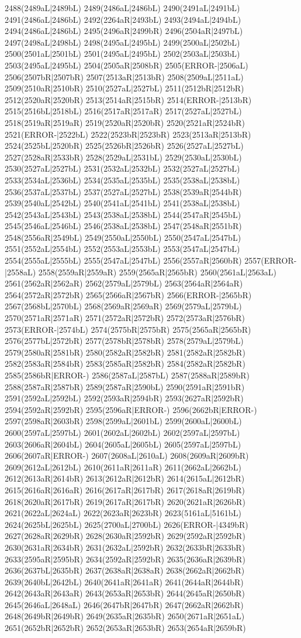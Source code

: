 2488(2489aL|2489bL) 2489(2486aL|2486bL) 2490(2491aL|2491bL) 2491(2486aL|2486bL) 2492(2264aR|2493bL) 2493(2494aL|2494bL) 2494(2486aL|2486bL) 2495(2496aR|2499bR) 2496(2504aR|2497bL) 2497(2498aL|2498bL) 2498(2495aL|2495bL) 2499(2500aL|2502bL) 2500(2501aL|2501bL) 2501(2495aL|2495bL) 2502(2503aL|2503bL) 2503(2495aL|2495bL) 2504(2505aR|2508bR) 2505(ERROR-|2506aL) 2506(2507bR|2507bR) 2507(2513aR|2513bR) 2508(2509aL|2511aL) 2509(2510aR|2510bR) 2510(2527aL|2527bL) 2511(2512bR|2512bR) 2512(2520aR|2520bR) 2513(2514aR|2515bR) 2514(ERROR-|2513bR) 2515(2516bL|2518bL) 2516(2517aR|2517aR) 2517(2527aL|2527bL) 2518(2519aR|2519aR) 2519(2520aR|2520bR) 2520(2521aR|2524bR) 2521(ERROR-|2522bL) 2522(2523bR|2523bR) 2523(2513aR|2513bR) 2524(2525bL|2520bR) 2525(2526bR|2526bR) 2526(2527aL|2527bL) 2527(2528aR|2533bR) 2528(2529aL|2531bL) 2529(2530aL|2530bL) 2530(2527aL|2527bL) 2531(2532aL|2532bL) 2532(2527aL|2527bL) 2533(2534aL|2536bL) 2534(2535aL|2535bL) 2535(2538aL|2538bL) 2536(2537aL|2537bL) 2537(2527aL|2527bL) 2538(2539aR|2544bR) 2539(2540aL|2542bL) 2540(2541aL|2541bL) 2541(2538aL|2538bL) 2542(2543aL|2543bL) 2543(2538aL|2538bL) 2544(2547aR|2545bL) 2545(2546aL|2546bL) 2546(2538aL|2538bL) 2547(2548aR|2551bR) 2548(2556aR|2549bL) 2549(2550aL|2550bL) 2550(2547aL|2547bL) 2551(2552aL|2554bL) 2552(2553aL|2553bL) 2553(2547aL|2547bL) 2554(2555aL|2555bL) 2555(2547aL|2547bL) 2556(2557aR|2560bR) 2557(ERROR-|2558aL) 2558(2559aR|2559aR) 2559(2565aR|2565bR) 2560(2561aL|2563aL) 2561(2562aR|2562aR) 2562(2579aL|2579bL) 2563(2564aR|2564aR) 2564(2572aR|2572bR) 2565(2566aR|2567bR) 2566(ERROR-|2565bR) 2567(2568bL|2570bL) 2568(2569aR|2569aR) 2569(2579aL|2579bL) 2570(2571aR|2571aR) 2571(2572aR|2572bR) 2572(2573aR|2576bR) 2573(ERROR-|2574bL) 2574(2575bR|2575bR) 2575(2565aR|2565bR) 2576(2577bL|2572bR) 2577(2578bR|2578bR) 2578(2579aL|2579bL) 2579(2580aR|2581bR) 2580(2582aR|2582bR) 2581(2582aR|2582bR) 2582(2583aR|2584bR) 2583(2585aR|2582bR) 2584(2582aR|2582bR) 2585(2586bR|ERROR-) 2586(2587aL|2587bL) 2587(2588aR|2589bR) 2588(2587aR|2587bR) 2589(2587aR|2590bL) 2590(2591aR|2591bR) 2591(2592aL|2592bL) 2592(2593aR|2594bR) 2593(2627aR|2592bR) 2594(2592aR|2592bR) 2595(2596aR|ERROR-) 2596(2662bR|ERROR-) 2597(2598aR|2603bR) 2598(2599aL|2601bL) 2599(2600aL|2600bL) 2600(2597aL|2597bL) 2601(2602aL|2602bL) 2602(2597aL|2597bL) 2603(2606aR|2604bL) 2604(2605aL|2605bL) 2605(2597aL|2597bL) 2606(2607aR|ERROR-) 2607(2608aL|2610aL) 2608(2609aR|2609bR) 2609(2612aL|2612bL) 2610(2611aR|2611aR) 2611(2662aL|2662bL) 2612(2613aR|2614bR) 2613(2612aR|2612bR) 2614(2615aL|2612bR) 2615(2616aR|2616aR) 2616(2617aR|2617bR) 2617(2618aR|2619bR) 2618(2620aR|2617bR) 2619(2617aR|2617bR) 2620(2621aR|2626bR) 2621(2622aL|2624aL) 2622(2623aR|2623bR) 2623(5161aL|5161bL) 2624(2625bL|2625bL) 2625(2700aL|2700bL) 2626(ERROR-|4349bR) 2627(2628aR|2629bR) 2628(2630aR|2592bR) 2629(2592aR|2592bR) 2630(2631aR|2634bR) 2631(2632aL|2592bR) 2632(2633bR|2633bR) 2633(2595aR|2595bR) 2634(2592aR|2592bR) 2635(2636aR|2639bR) 2636(2637bL|2635bR) 2637(2638aR|2638aR) 2638(2662aR|2662bR) 2639(2640bL|2642bL) 2640(2641aR|2641aR) 2641(2644aR|2644bR) 2642(2643aR|2643aR) 2643(2653aR|2653bR) 2644(2645aR|2650bR) 2645(2646aL|2648aL) 2646(2647bR|2647bR) 2647(2662aR|2662bR) 2648(2649bR|2649bR) 2649(2635aR|2635bR) 2650(2671aR|2651aL) 2651(2652bR|2652bR) 2652(2653aR|2653bR) 2653(2654aR|2659bR) 